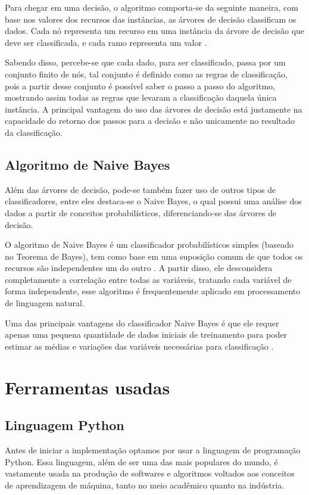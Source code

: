 \documentclass[preprint,12pt,times]{elsarticle}
\begin{document}
	Para chegar em uma decisão, o algoritmo comporta-se da seguinte maneira, com base nos valores dos recursos das instâncias, as árvores de decisão classificam os dados. Cada nó representa um recurso em uma instância da árvore de decisão que deve ser classificada, e cada ramo representa um valor \cite{Pandya:2015}.

	Sabendo disso, percebe-se que cada dado, para ser classificado, passa por um conjunto finito de nós, tal conjunto é definido como as regras de classificação, pois a partir desse conjunto é possível saber o passo a passo do algoritmo, mostrando assim todas as regras que levaram a classificação daquela única instância. A principal vantagem do uso das árvores de decisão está justamente na capacidade do retorno dos passos para a decisão e não unicamente no resultado da classificação.

	\subsection{Algoritmo de Naive Bayes}

	Além das árvores de decisão, pode-se também fazer uso de outros tipos de classificadores, entre eles destaca-se o Naive Bayes, o qual possui uma análise dos dados a partir de conceitos probabilísticos, diferenciando-se das árvores de decisão.
	
	O algoritmo de Naive Bayes é um classificador probabilísticos simples (baseado no Teorema de Bayes), tem como base em uma suposição comum de que todos os recursos são independentes um do outro \cite{xu:2018}. A partir disso, ele desconsidera completamente a correlação entre todas as variáveis, tratando cada variável de forma independente, esse algoritmo  é frequentemente aplicado em processamento de linguagem natural.
	
	Uma das principais vantagens do classificador Naive Bayes é que ele requer apenas uma pequena quantidade de dados iniciais de treinamento para poder estimar as médias e variações das variáveis necessárias para classificação \cite{vijayarani:2015}.
	
	\section{Ferramentas usadas}
	\label{Ferramentas usadas}
	
	\subsection{Linguagem Python}
	Antes de iniciar a implementação optamos por usar a linguagem de programação Python. Essa linguagem, além de ser uma das mais populares do mundo, é vastamente usada na produção de softwares e algoritmos voltados aos conceitos de aprendizagem de máquina, tanto no meio acadêmico quanto na indústria. 
	
\end{document}
